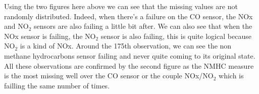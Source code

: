 Using the two figures here above we can see that the missing values are not randomly distributed.
Indeed, when there's a failure on the CO sensor, the NOx and NO$_2$ sensors are also failing a little bit after.
We can also see that when the NOx sensor is failing, the NO$_2$ sensor is also failing, this is quite logical because NO$_2$ is a kind of NOx.
Around the 175th observation, we can see the non methane hydrocarbons sensor failing and never quite coming to its original state. 
All these observations are confirmed by the second figure as the NMHC measure is the most missing well over the CO sensor or the couple NOx/NO$_2$ which is failling the same number of times.



